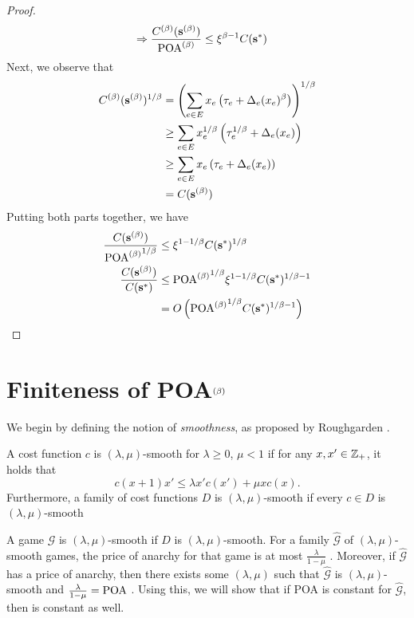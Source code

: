 \documentclass[twoside]{article}
\begin{document}
\begin{multicols}{2}
\begin{proof}
\begin{align*}
  \Rightarrow \frac{C^{(\beta)}(\mathbf{s}^{(\beta)})}{\text{POA}^{(\beta)}} &\le \xi^{\beta-1} C(\mathbf{s}^*)
  \end{align*}
  Next, we observe that
  \begin{align*}
    C^{(\beta)}(\mathbf{s}^{(\beta)})^{1/\beta} &= \left(\sum_{e \in E} x_e\left(\tau_e +
    \Delta_e(x_e)^\beta\right)\right)^{1/\beta} \\
    &\ge \sum_{e \in E} x_e^{1/\beta}\left(\tau_e^{1/\beta} + \Delta_e(x_e)\right) \\
    &\ge \sum_{e \in E} x_e\left(\tau_e + \Delta_e(x_e)\right) \\
    &= C(\mathbf{s}^{(\beta)})
  \end{align*}
  Putting both parts together, we have
  \begin{align*}
    \frac{C(\mathbf{s}^{(\beta)})}{{\text{POA}^{(\beta)}}^{1/\beta}} &\le \xi^{1-1/\beta} C(\mathbf{s}^*)^{1/\beta} \\
    \frac{C(\mathbf{s}^{(\beta)})}{C(\mathbf{s}^*)} &\le {\ensuremath{\text{POA}^{(\beta)}}}^{1/\beta} \xi^{1-1/\beta}
    C(\mathbf{s}^*)^{1/\beta-1} \\
    &= O\left({\text{POA}^{(\beta)}}^{1/\beta} C(\mathbf{s}^*)^{1/\beta-1}\right)
  \end{align*}
\end{proof}


\section{Finiteness of POA$^{(\beta)}$} \label{sec:ubl}
We begin by defining the notion of \textit{smoothness}, as proposed by
Roughgarden \cite{Roughgarden2012}.
\begin{defn}
  A cost function $c$ is $(\lambda,\mu)$-smooth for $\lambda \ge 0$, $\mu < 1$
  if for any $x,x' \in \mathbb{Z}_+$, it holds that
  \begin{equation}
    c(x+1) x' \le \lambda x' c(x') + \mu x c(x).
    \label{eq:lms1}
  \end{equation}
  Furthermore, a family of cost functions $D$ is $(\lambda,\mu)$-smooth if every
  $c \in D$ is $(\lambda,\mu)$-smooth
\end{defn}A game $\mathcal{G}$ is $(\lambda,\mu)$-smooth if $D$ is $(\lambda,\mu)$-smooth.
For a family $\hat{\mathcal{G}}$ of $(\lambda,\mu)$-smooth games, the price of
anarchy for that game is at most $\frac{\lambda}{1-\mu}$ \cite{Roughgarden2012}.
Moreover, if $\hat{\mathcal{G}}$ has a price of anarchy, then there exists
some $(\lambda,\mu)$ such that $\hat{\mathcal{G}}$ is $(\lambda,\mu)$-smooth and
$\frac{\lambda}{1-\mu} = \text{POA}$ \cite{Roughgarden2012}. Using this, we will show
that if POA is constant for $\hat{\mathcal{G}}$, then \poab is constant as well.


\end{multicols}
\end{document}
